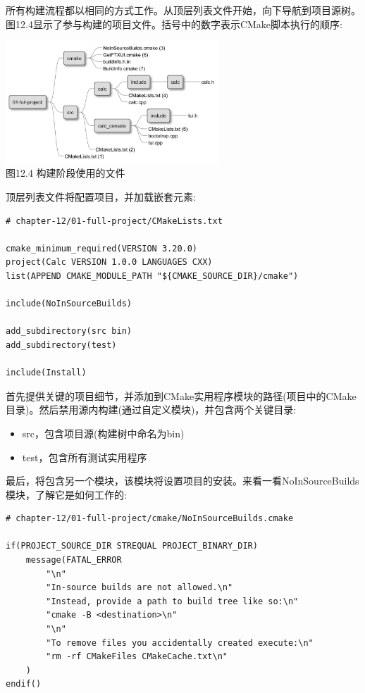 
所有构建流程都以相同的方式工作。从顶层列表文件开始，向下导航到项目源树。图12.4显示了参与构建的项目文件。括号中的数字表示CMake脚本执行的顺序:

\begin{center}
\includegraphics[width=0.6\textwidth]{content/3/chapter12/images/4.jpg}\\
图12.4 构建阶段使用的文件
\end{center}

顶层列表文件将配置项目，并加载嵌套元素:

\begin{lstlisting}[style=styleCMake]
# chapter-12/01-full-project/CMakeLists.txt

cmake_minimum_required(VERSION 3.20.0)
project(Calc VERSION 1.0.0 LANGUAGES CXX)
list(APPEND CMAKE_MODULE_PATH "${CMAKE_SOURCE_DIR}/cmake")

include(NoInSourceBuilds)

add_subdirectory(src bin)
add_subdirectory(test)

include(Install)
\end{lstlisting}

首先提供关键的项目细节，并添加到CMake实用程序模块的路径(项目中的CMake目录)。然后禁用源内构建(通过自定义模块)，并包含两个关键目录:

\begin{itemize}
\item 
src，包含项目源(构建树中命名为bin)

\item 
test，包含所有测试实用程序
\end{itemize}

最后，将包含另一个模块，该模块将设置项目的安装。来看一看NoInSourceBuilds模块，了解它是如何工作的:

\begin{lstlisting}[style=styleCMake]
# chapter-12/01-full-project/cmake/NoInSourceBuilds.cmake

if(PROJECT_SOURCE_DIR STREQUAL PROJECT_BINARY_DIR)
	message(FATAL_ERROR
		"\n"
		"In-source builds are not allowed.\n"
		"Instead, provide a path to build tree like so:\n"
		"cmake -B <destination>\n"
		"\n"
		"To remove files you accidentally created execute:\n"
		"rm -rf CMakeFiles CMakeCache.txt\n"
	)
endif()
\end{lstlisting}

